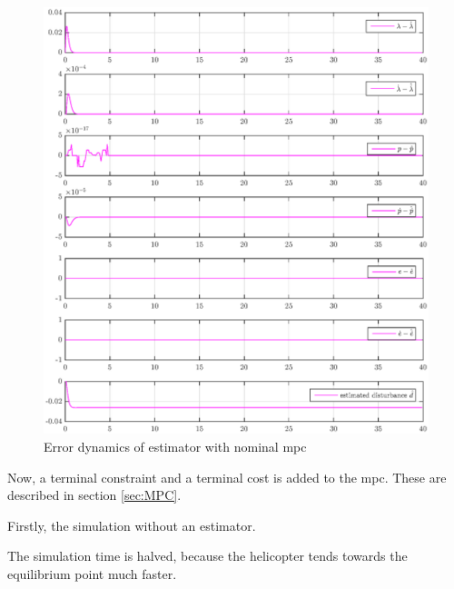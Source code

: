 \begin{figure}[h!]
    \centering
    \includegraphics[scale=0.5]{fig/heli_sim_est_not_stable_extended_horizon_error_plot.eps}
    \caption{Error dynamics of estimator with nominal \acrshort{mpc}}
    \label{fig:my_label}
\end{figure}

Now, a terminal constraint and a terminal cost is added to the \acrshort{mpc}. These are described in section \ref{sec:MPC}. 

Firstly, the simulation without an estimator.

The simulation time is halved, because the helicopter tends towards the equilibrium point much faster. 

